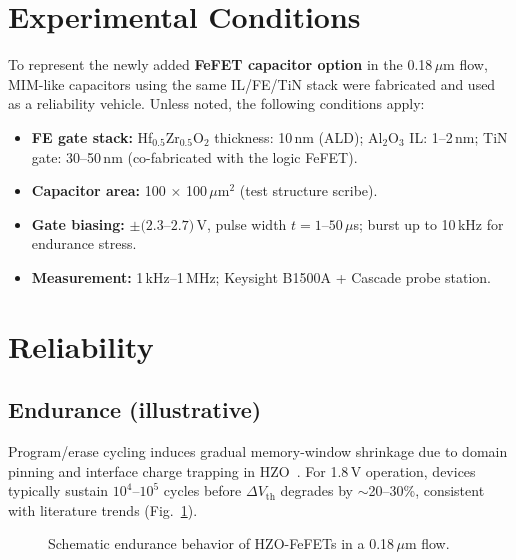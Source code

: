 \documentclass[conference]{IEEEtran}
\begin{document}
\section{Experimental Conditions}
To represent the newly added \textbf{FeFET capacitor option} in the 0.18\,$\mu$m flow, MIM-like capacitors using the same IL/FE/TiN stack were fabricated and used as a reliability vehicle. Unless noted, the following conditions apply:
\begin{itemize}
  \item \textbf{FE gate stack:} Hf$_{0.5}$Zr$_{0.5}$O$_2$ thickness: 10\,nm (ALD); Al$_2$O$_3$ IL: 1--2\,nm; TiN gate: 30--50\,nm (co-fabricated with the logic FeFET).
  \item \textbf{Capacitor area:} 100 $\times$ 100\,$\mu$m$^2$ (test structure scribe).
  \item \textbf{Gate biasing:} $\pm(2.3$--$2.7)$\,V, pulse width $t=1$--$50\,\mu$s; burst up to 10\,kHz for endurance stress.
  \item \textbf{Measurement:} 1\,kHz--1\,MHz; Keysight B1500A + Cascade probe station.
\end{itemize}

\section{Reliability}

\subsection{Endurance (illustrative)}
Program/erase cycling induces gradual memory-window shrinkage due to domain pinning and interface charge trapping in HZO~\cite{Boscke2011,Muller2012}. For 1.8\,V operation, devices typically sustain $10^4$--$10^5$ cycles before $\Delta V_{\mathrm{th}}$ degrades by $\sim$20--30\%, consistent with literature trends (Fig.~\ref{fig:endurance}).

\begin{figure}[H]
\centering
{}
\caption{Schematic endurance behavior of HZO-FeFETs in a 0.18\,$\mu$m flow.}
\label{fig:endurance}
\end{figure}
\end{document}
